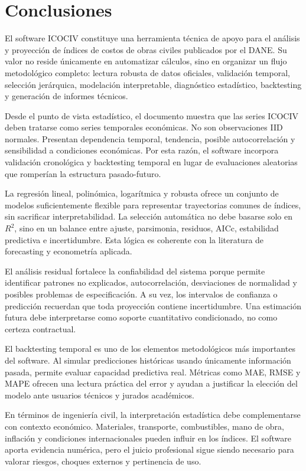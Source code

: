 \section{Conclusiones}

El software ICOCIV constituye una herramienta técnica de apoyo para el análisis y proyección de índices de costos de obras civiles publicados por el DANE. Su valor no reside únicamente en automatizar cálculos, sino en organizar un flujo metodológico completo: lectura robusta de datos oficiales, validación temporal, selección jerárquica, modelación interpretable, diagnóstico estadístico, backtesting y generación de informes técnicos.

Desde el punto de vista estadístico, el documento muestra que las series ICOCIV deben tratarse como series temporales económicas. No son observaciones IID normales. Presentan dependencia temporal, tendencia, posible autocorrelación y sensibilidad a condiciones económicas. Por esta razón, el software incorpora validación cronológica y backtesting temporal en lugar de evaluaciones aleatorias que romperían la estructura pasado-futuro.

La regresión lineal, polinómica, logarítmica y robusta ofrece un conjunto de modelos suficientemente flexible para representar trayectorias comunes de índices, sin sacrificar interpretabilidad. La selección automática no debe basarse solo en \(R^2\), sino en un balance entre ajuste, parsimonia, residuos, AICc, estabilidad predictiva e incertidumbre. Esta lógica es coherente con la literatura de forecasting y econometría aplicada.

El análisis residual fortalece la confiabilidad del sistema porque permite identificar patrones no explicados, autocorrelación, desviaciones de normalidad y posibles problemas de especificación. A su vez, los intervalos de confianza o predicción recuerdan que toda proyección contiene incertidumbre. Una estimación futura debe interpretarse como soporte cuantitativo condicionado, no como certeza contractual.

El backtesting temporal es uno de los elementos metodológicos más importantes del software. Al simular predicciones históricas usando únicamente información pasada, permite evaluar capacidad predictiva real. Métricas como MAE, RMSE y MAPE ofrecen una lectura práctica del error y ayudan a justificar la elección del modelo ante usuarios técnicos y jurados académicos.

En términos de ingeniería civil, la interpretación estadística debe complementarse con contexto económico. Materiales, transporte, combustibles, mano de obra, inflación y condiciones internacionales pueden influir en los índices. El software aporta evidencia numérica, pero el juicio profesional sigue siendo necesario para valorar riesgos, choques externos y pertinencia de uso.

